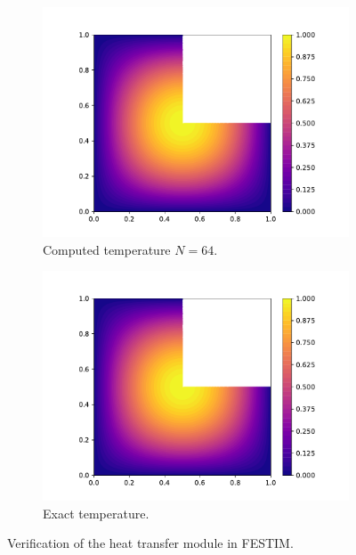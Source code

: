 \begin{figure}
    \centering
    \begin{subfigure}{0.5\linewidth}
        \centering
        \includegraphics[width=\linewidth]{Figures/Chapter2/T.pdf}
        \caption{Computed temperature $N=64$.}
    \end{subfigure}%
    \begin{subfigure}{0.5\linewidth}
        \centering
        \includegraphics[width=\linewidth]{Figures/Chapter2/T_exact.pdf}
        \caption{Exact temperature.}
    \end{subfigure}

    \caption{Verification of the heat transfer module in FESTIM.}
    \label{fig: results MMS heat transfer}
\end{figure}

